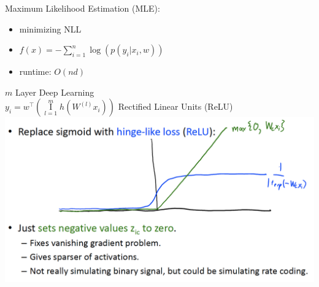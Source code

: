 \documentclass[10pt,landscape,a4paper]{article}
\DeclareMathOperator*{\composition}{I}
\begin{document}
\begin{multicols*}{5}
Maximum Likelihood Estimation (MLE):
\begin{itemize}
    \item minimizing NLL
    \item \(f(x) = - \sum_{i=1}^{n}\log{(p(y_i|x_i,w))}\)
    \item runtime: \(O(nd)\)
\end{itemize}
\(m\) Layer Deep Learning \\
$y_i = w^\intercal (\composition\limits_{l=1}^{m} h(W^{(l)} x_i))$
Rectified Linear Units (ReLU)
\includegraphics[scale=0.15]{relu}


\end{multicols*}
\end{document}
